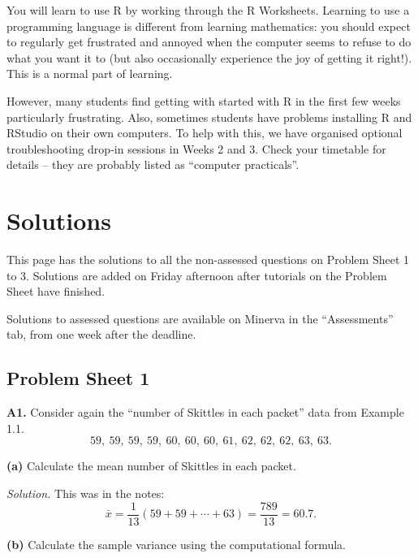 \documentclass[
  a4paper,
]{book}
\newif\ifcomm\commtrue
\theoremstyle{definition}
\theoremstyle{definition}
\theoremstyle{definition}
\theoremstyle{definition}
\theoremstyle{remark}
\begin{document}
You will learn to use R by working through the R Worksheets. Learning to use a programming language is different from learning mathematics: you should expect to regularly get frustrated and annoyed when the computer seems to refuse to do what you want it to (but also occasionally experience the joy of getting it right!). This is a normal part of learning.

However, many students find getting with started with R in the first few weeks particularly frustrating. Also, sometimes students have problems installing R and RStudio on their own computers. To help with this, we have organised optional troubleshooting drop-in sessions in Weeks 2 and 3. Check your timetable for details -- they are probably listed as ``computer practicals''.

\commtrue

\hypertarget{solutions}{%
\chapter*{Solutions}\label{solutions}}

This page has the solutions to all the non-assessed questions on Problem Sheet 1 to 3. Solutions are added on Friday afternoon after tutorials on the Problem Sheet have finished.

Solutions to assessed questions are available on Minerva in the ``Assessments'' tab, from one week after the deadline.

\hypertarget{P1-solutions}{%
\section*{Problem Sheet 1}\label{P1-solutions}}

\textbf{A1.} Consider again the ``number of Skittles in each packet'' data from Example 1.1.
\[ 59, \ 59, \ 59, \ 59, \ 60, \ 60, \ 60, \ 61, \ 62, \ 62, \ 62, \ 63, \ 63 .\]

\textbf{(a)} Calculate the mean number of Skittles in each packet.

\begin{myanswers}
\emph{Solution.}
This was in the notes:
\[ \bar x = \frac{1}{13} (59 + 59 + \cdots + 63) =  \frac{789}{13} = 60.7 .\]

\end{myanswers}

\textbf{(b)} Calculate the sample variance using the computational formula.
\end{document}

